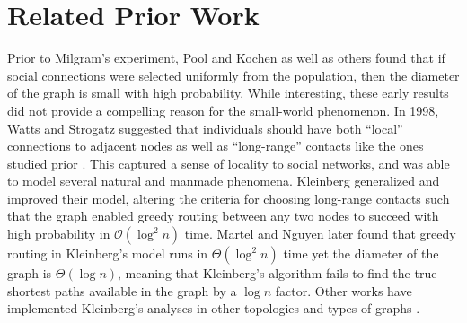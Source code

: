 \section{Related Prior Work} \label{sec:related-work}

Prior to Milgram's experiment, Pool and Kochen \cite{de1978contacts} as well as others \cite{kochensmallworld} found that if social connections were selected uniformly from the population, then the diameter of the graph is small with high probability. 
While interesting, these early results did not provide a compelling reason for the small-world phenomenon. 
In 1998, Watts and Strogatz suggested that individuals should have both ``local'' connections to adjacent nodes as well as ``long-range'' contacts like the ones studied prior \cite{watts1998collective}. 
This captured a sense of locality to social networks, and was able to model several natural and manmade phenomena. 
Kleinberg \cite{kleinberg2000small} generalized and improved their model, altering the criteria for choosing long-range contacts such that the graph enabled greedy routing between any two nodes to succeed with high probability in $\mathcal{O}(\log^2 n)$ time. 
Martel and Nguyen \cite{martel} later found that greedy routing in Kleinberg's model runs in $\Theta(\log^2 n)$ time yet the diameter of the graph is $\Theta(\log n)$, meaning that Kleinberg's algorithm fails to find the true shortest paths available in the graph by a $\log n$ factor. 
Other works have implemented Kleinberg's analyses in other topologies and types of graphs \cite{fraigniaudgreedy,kleinbergdynamics,barriereefficient,duchon2006could}. 

